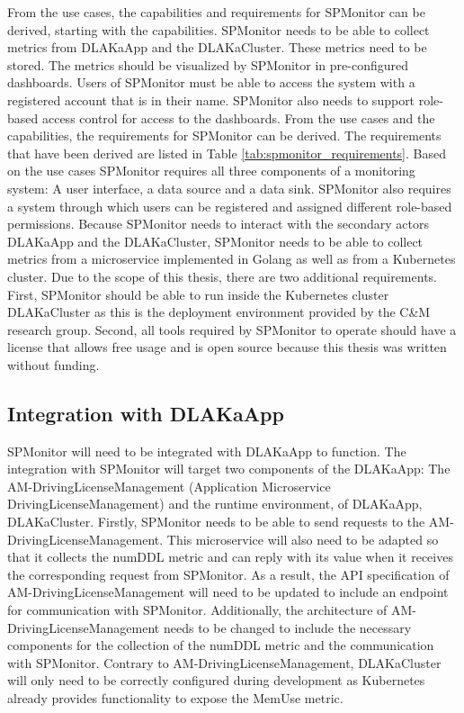 From the use cases, the capabilities and requirements for SPMonitor can be
derived, starting with the capabilities. SPMonitor needs to be able to collect metrics
from DLAKaApp and the DLAKaCluster. These metrics need to be stored. The
metrics should be visualized by SPMonitor in pre-configured dashboards. Users
of SPMonitor must be able to access the system with a registered account that
is in their name. SPMonitor also needs to support role-based access control for
access to the dashboards. From the use cases and the capabilities, the
requirements for SPMonitor can be derived. The requirements that have been
derived are listed in Table \ref{tab:spmonitor_requirements}. Based on the use
cases SPMonitor requires all three components of a monitoring system: A user
interface, a data source and a data sink. SPMonitor also requires a system
through which users can be registered and assigned different role-based
permissions. Because SPMonitor needs to interact with the secondary actors
DLAKaApp and the DLAKaCluster, SPMonitor needs to be able to collect metrics
from a microservice implemented in Golang as well as from a Kubernetes cluster.
Due to the scope of this thesis, there are two additional requirements. First,
SPMonitor should be able to run inside the Kubernetes cluster DLAKaCluster as this
is the deployment environment provided by the C\&M research group.
Second, all tools required by SPMonitor to operate should have a license that
allows free usage and is open source because this thesis was written without funding.

\subsection{Integration with DLAKaApp}

SPMonitor will need to be integrated with DLAKaApp to function. The integration
with SPMonitor will target two components of the DLAKaApp: The AM-DrivingLicenseManagement (Application
Microservice DrivingLicenseManagement) and the runtime environment, of DLAKaApp,
DLAKaCluster. Firstly, SPMonitor needs to be able to send requests to the
AM-DrivingLicenseManagement. This microservice will also
need to be adapted so that it collects the numDDL metric and can reply with
its value when it receives the corresponding request from SPMonitor. As a
result, the API specification of AM-DrivingLicenseManagement will need to be
updated to include an endpoint for communication with SPMonitor. Additionally,
the architecture of AM-DrivingLicenseManagement needs to be changed to include the
necessary components for the collection of the numDDL metric and the
communication with SPMonitor. Contrary to
AM-DrivingLicenseManagement, DLAKaCluster will only need to be correctly
configured during development as Kubernetes already provides functionality to
expose the MemUse metric.

